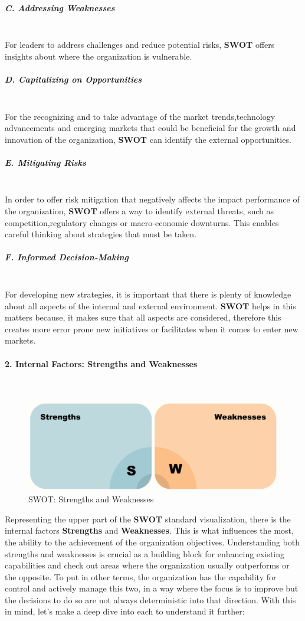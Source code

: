 \subparagraph{C. Addressing Weaknesses}\mbox{}\\
For leaders to address challenges and reduce potential risks, \textbf{SWOT} offers insights about where the organization is vulnerable.

\subparagraph{D. Capitalizing on Opportunities}\mbox{}\\
For the recognizing and to take advantage of the market trends,technology advancements and emerging markets that could be beneficial for the growth and innovation of the organization, \textbf{SWOT} can identify the external opportunities.

\subparagraph{E. Mitigating Risks}\mbox{}\\
In order to offer risk mitigation that negatively affects the impact performance of the organization, \textbf{SWOT} offers a way to identify external threats, such as competition,regulatory changes or macro-economic downturns. This enables careful thinking about strategies that must be taken.

\subparagraph{F. Informed Decision-Making}\mbox{}\\
For developing new strategies, it is important that there is plenty of knowledge about all aspects of the internal and external environment. \textbf{SWOT} helps in this matters because, it makes sure that all aspects are considered, therefore this creates more error prone new initiatives or facilitates when it comes to enter new markets.


\paragraph{2. Internal Factors: Strengths and Weaknesses}\mbox{}\\
\begin{figure}[H]
    \centering
    \includegraphics[width=1\textwidth]{assets/swot/strengths-and-weaknesses.png} %
    \caption{SWOT: Strengths and Weaknesses}
    \label{fig:sample-image} 
\end{figure}
Representing the upper part of the \textbf{SWOT} standard visualization, there is the internal factors \textbf{Strengths} and \textbf{Weaknesses}. This is what influences the most, the ability to the achievement of the organization objectives. Understanding both strengths and weaknesses is crucial as a building block for enhancing existing capabilities and check out areas where the organization usually outperforms or the opposite. To put in other terms, the organization has the capability for control and actively manage this two, in a way where the focus is to improve but the decisions to do so are not always deterministic into that direction. With this in mind, let's make a deep dive into each to understand it further:

